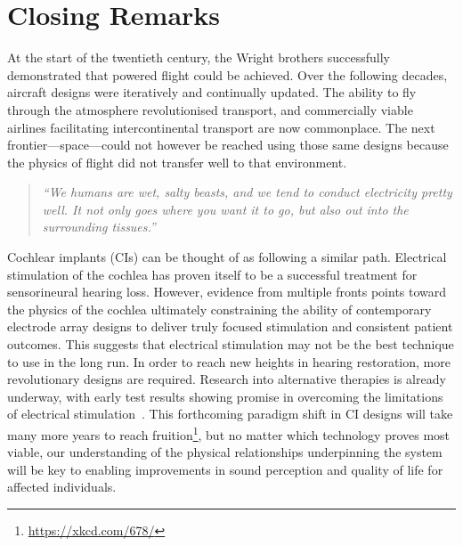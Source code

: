 \section{Closing Remarks}

At the start of the twentieth century, the Wright brothers successfully
demonstrated that powered flight could be achieved. Over the following decades,
aircraft designs were iteratively and continually updated. The ability to fly
through the atmosphere revolutionised transport, and commercially viable
airlines facilitating intercontinental transport are now commonplace. The next
frontier---space---could not however be reached using those same designs because
the physics of flight did not transfer well to that environment.

\begin{verse}
	\textit{
		``We humans are wet, salty beasts, and we tend to conduct electricity pretty
		well. It not only goes where you want it to go, but also out into the
		surrounding tissues.''}

	\vspace{4mm}

\end{verse}

Cochlear implants (CIs) can be thought of as following a similar path.
Electrical stimulation of the cochlea has proven itself to be a successful
treatment for sensorineural hearing loss. However, evidence from multiple fronts
points toward the physics of the cochlea ultimately constraining the ability of
contemporary electrode array designs to deliver truly focused stimulation and
consistent patient outcomes. This suggests that electrical stimulation may not
be the best technique to use in the long run. In order to reach new heights in
hearing restoration, more revolutionary designs are required. Research into
alternative therapies is already underway, with early test results showing
promise in overcoming the limitations of electrical
stimulation~\cite{miller1997,izzo2006,izzo2007,richardson2009,jeschke2015}.
This forthcoming paradigm shift in CI designs will take many more years to reach
fruition\footnote{\href{https://xkcd.com/678/}{https://xkcd.com/678/}}, but no
matter which technology proves most viable, our understanding of the physical
relationships underpinning the system will be key to enabling improvements in
sound perception and quality of life for affected individuals.
